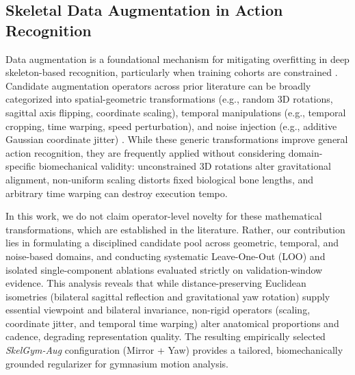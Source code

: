 \documentclass[runningheads]{llncs}
\begin{document}
\subsection{Skeletal Data Augmentation in Action Recognition}
Data augmentation is a foundational mechanism for mitigating overfitting in deep skeleton-based recognition, particularly when training cohorts are constrained \cite{yan2018,shi2020skeleton}. Candidate augmentation operators across prior literature can be broadly categorized into spatial-geometric transformations (e.g., random 3D rotations, sagittal axis flipping, coordinate scaling), temporal manipulations (e.g., temporal cropping, time warping, speed perturbation), and noise injection (e.g., additive Gaussian coordinate jitter) \cite{xin2024augmentation}. While these generic transformations improve general action recognition, they are frequently applied without considering domain-specific biomechanical validity: unconstrained 3D rotations alter gravitational alignment, non-uniform scaling distorts fixed biological bone lengths, and arbitrary time warping can destroy execution tempo.

In this work, we do not claim operator-level novelty for these mathematical transformations, which are established in the literature. Rather, our contribution lies in formulating a disciplined candidate pool across geometric, temporal, and noise-based domains, and conducting systematic Leave-One-Out (LOO) and isolated single-component ablations evaluated strictly on validation-window evidence. This analysis reveals that while distance-preserving Euclidean isometries (bilateral sagittal reflection and gravitational yaw rotation) supply essential viewpoint and bilateral invariance, non-rigid operators (scaling, coordinate jitter, and temporal time warping) alter anatomical proportions and cadence, degrading representation quality. The resulting empirically selected \textit{SkelGym-Aug} configuration (Mirror + Yaw) provides a tailored, biomechanically grounded regularizer for gymnasium motion analysis.
\end{document}
